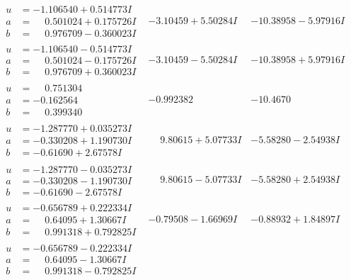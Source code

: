 \documentclass[1p]{elsarticle_modified}
\theoremstyle{definition}
\begin{document}
$$\begin{array}{c|c|c}
\begin{aligned}
u &= -1.106540 + 0.514773 I \\
a &= \phantom{-}0.501024 + 0.175726 I \\
b &= \phantom{-}0.976709 - 0.360023 I\end{aligned}
 & -3.10459 + 5.50284 I & -10.38958 - 5.97916 I \\ \hline\begin{aligned}
u &= -1.106540 - 0.514773 I \\
a &= \phantom{-}0.501024 - 0.175726 I \\
b &= \phantom{-}0.976709 + 0.360023 I\end{aligned}
 & -3.10459 - 5.50284 I & -10.38958 + 5.97916 I \\ \hline\begin{aligned}
u &= \phantom{-}0.751304\phantom{ +0.000000I} \\
a &= -0.162564\phantom{ +0.000000I} \\
b &= \phantom{-}0.399340\phantom{ +0.000000I}\end{aligned}
 & -0.992382\phantom{ +0.000000I} & -10.4670\phantom{ +0.000000I} \\ \hline\begin{aligned}
u &= -1.287770 + 0.035273 I \\
a &= -0.330208 + 1.190730 I \\
b &= -0.61690 + 2.67578 I\end{aligned}
 & \phantom{-}9.80615 + 5.07733 I & -5.58280 - 2.54938 I \\ \hline\begin{aligned}
u &= -1.287770 - 0.035273 I \\
a &= -0.330208 - 1.190730 I \\
b &= -0.61690 - 2.67578 I\end{aligned}
 & \phantom{-}9.80615 - 5.07733 I & -5.58280 + 2.54938 I \\ \hline\begin{aligned}
u &= -0.656789 + 0.222334 I \\
a &= \phantom{-}0.64095 + 1.30667 I \\
b &= \phantom{-}0.991318 + 0.792825 I\end{aligned}
 & -0.79508 - 1.66969 I & -0.88932 + 1.84897 I \\ \hline\begin{aligned}
u &= -0.656789 - 0.222334 I \\
a &= \phantom{-}0.64095 - 1.30667 I \\
b &= \phantom{-}0.991318 - 0.792825 I\end{aligned}

\end{array}$$
\end{document}
